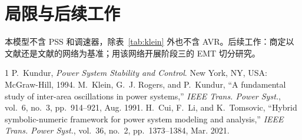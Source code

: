 \documentclass[conference,letterpaper]{IEEEtran}
\begin{document}
\section{局限与后续工作}
本模型不含 PSS 和调速器，除表~\ref{tab:klein} 外也不含 AVR。后续工作：商定以文献\cite{kundur}还是文献\cite{klein}的网络为基准；用该网络开展阶段三的 EMT 切分研究。

\begin{thebibliography}{1}
 P.~Kundur, \emph{Power System Stability and Control}. New York, NY, USA: McGraw-Hill, 1994.
 M.~Klein, G.~J. Rogers, and P.~Kundur, ``A fundamental study of inter-area oscillations in power systems,'' \emph{IEEE Trans. Power Syst.}, vol.~6, no.~3, pp.~914--921, Aug. 1991.
 H.~Cui, F.~Li, and K.~Tomsovic, ``Hybrid symbolic-numeric framework for power system modeling and analysis,'' \emph{IEEE Trans. Power Syst.}, vol.~36, no.~2, pp.~1373--1384, Mar. 2021.
\end{thebibliography}
\end{document}
